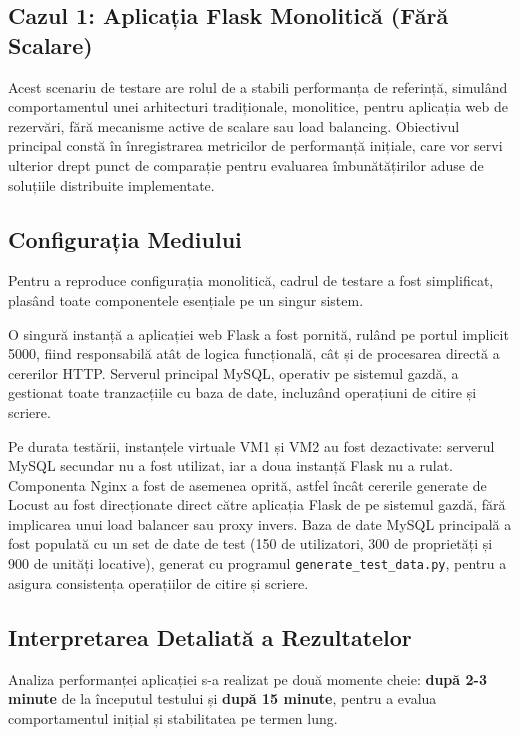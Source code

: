 \documentclass[12pt, a4paper, oneside, romanian]{teza-upb}
\begin{document}
\subsection{Cazul 1: Aplicația Flask Monolitică (Fără Scalare)}

Acest scenariu de testare are rolul de a stabili performanța de referință, simulând comportamentul unei arhitecturi tradiționale, monolitice, pentru aplicația web de rezervări, fără mecanisme active de scalare sau load balancing. Obiectivul principal constă în înregistrarea metricilor de performanță inițiale, care vor servi ulterior drept punct de comparație pentru evaluarea îmbunătățirilor aduse de soluțiile distribuite implementate.

\subsection*{Configurația Mediului}

Pentru a reproduce configurația monolitică, cadrul de testare a fost simplificat, plasând toate componentele esențiale pe un singur sistem.

O singură instanță a aplicației web Flask a fost pornită, rulând pe portul implicit 5000, fiind responsabilă atât de logica funcțională, cât și de procesarea directă a cererilor HTTP. Serverul principal MySQL, operativ pe sistemul gazdă, a gestionat toate tranzacțiile cu baza de date, incluzând operațiuni de citire și scriere.

Pe durata testării, instanțele virtuale VM1 și VM2 au fost dezactivate: serverul MySQL secundar nu a fost utilizat, iar a doua instanță Flask nu a rulat. Componenta Nginx a fost de asemenea oprită, astfel încât cererile generate de Locust au fost direcționate direct către aplicația Flask de pe sistemul gazdă, fără implicarea unui load balancer sau proxy invers. Baza de date MySQL principală a fost populată cu un set de date de test (150 de utilizatori, 300 de proprietăți și 900 de unități locative), generat cu programul \texttt{generate\_test\_data.py}, pentru a asigura consistența operațiilor de citire și scriere.

\subsection*{Interpretarea Detaliată a Rezultatelor}

Analiza performanței aplicației s-a realizat pe două momente cheie: \textbf{după 2-3 minute} de la începutul testului și \textbf{după 15 minute}, pentru a evalua comportamentul inițial și stabilitatea pe termen lung.
\end{document}
